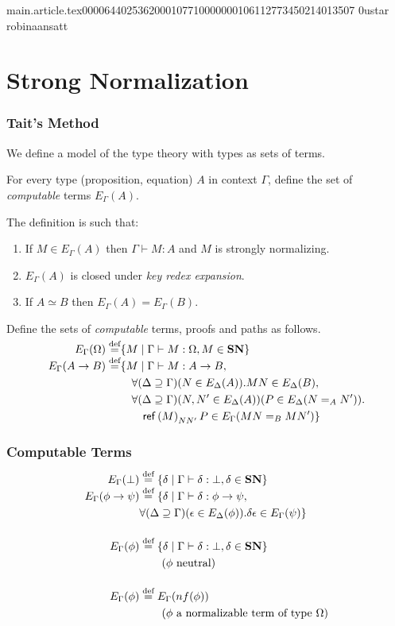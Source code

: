 main.article.tex                                                                                    0000644 0253620 0010771 00000001061 12773450214 013507  0                                                                                                    ustar   robina                          ansatt                                                                                                                                                                                                                 \documentclass{article}
\begin{document}
\section{Strong Normalization}

\begin{frame}
\frametitle{Tait's Method}

We define a model of the type theory with types as sets of terms.

For every type (proposition, equation) $A$ in context $\Gamma$, define
the set of \emph{computable} terms $E_\Gamma(A)$.

The definition is such that:
\begin{enumerate}
\item
If $M \in E_\Gamma(A)$ then $\Gamma \vdash M : A$ and $M$ is strongly normalizing.
\item
$E_\Gamma(A)$ is closed under \emph{key redex expansion}.
\item
If $A \simeq B$ then $E_\Gamma(A) = E_\Gamma(B)$.
\end{enumerate}
\end{frame}

\begin{frame}
Define the sets of \emph{computable} terms, proofs and paths as follows.
\begin{align*}
E_\Gamma(\Omega) \mathrel{\smash{\stackrel{\text{def}}{=}}} & \{ M \mid \Gamma \vdash M : \Omega, M \in \mathbf{SN} \} \\
E_\Gamma(A \rightarrow B) \mathrel{\smash{\stackrel{\text{def}}{=}}} & \{ M \mid \Gamma \vdash M : A \rightarrow B, \\
& \quad \forall (\Delta \supseteq \Gamma) (N \in E_\Delta(A)). MN \in E_\Delta(B), \\
& \quad \forall (\Delta \supseteq \Gamma) (N, N' \in E_\Delta(A)) (P \in E_\Delta(N =_A N')). \\
& \quad \quad \mathsf{ref} \left( {M} \right)_{N N'} P \in E_\Gamma(MN =_B MN') \}
\end{align*}
\end{frame}

\begin{frame}
\frametitle{Computable Terms}
\begin{align*}
E_\Gamma(\bot) & \mathrel{\smash{\stackrel{\text{def}}{=}}} \{ \delta \mid \Gamma \vdash \delta : \bot, \delta \in \mathbf{SN} \} \\
E_\Gamma(\phi \rightarrow \psi) & \mathrel{\smash{\stackrel{\text{def}}{=}}} \{ \delta \mid \Gamma \vdash \delta : \phi \rightarrow \psi, \\
& \forall (\Delta \supseteq \Gamma)(\epsilon \in E_\Delta(\phi)). \delta \epsilon \in E_\Gamma(\psi) \} \\
\\
E_\Gamma(\phi) & \mathrel{\smash{\stackrel{\text{def}}{=}}} \{ \delta \mid \Gamma \vdash \delta : \bot, \delta \in \mathbf{SN} \} \\
& \qquad (\phi \text{ neutral}) \\
\\
E_\Gamma(\phi) & \mathrel{\smash{\stackrel{\text{def}}{=}}} E_\Gamma(nf(\phi)) \\
& \qquad (\phi \mbox{ a normalizable term of type $\Omega$})
\end{align*}
\end{frame}
\end{document}
